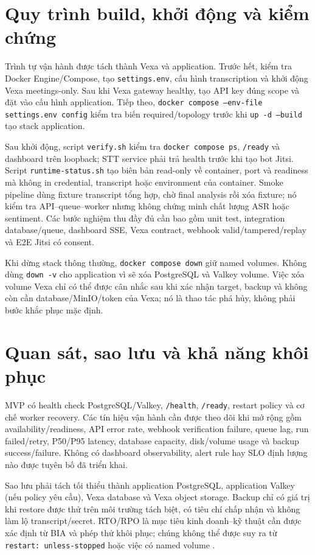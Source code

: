 \section{Quy trình build, khởi động và kiểm chứng}
Trình tự vận hành được tách thành Vexa và application. Trước hết, kiểm tra Docker Engine/Compose, tạo \texttt{settings.env}, cấu hình transcription và khởi động Vexa meetings-only. Sau khi Vexa gateway healthy, tạo API key đúng scope và đặt vào cấu hình application. Tiếp theo, \texttt{docker compose --env-file settings.env config} kiểm tra biến required/topology trước khi \texttt{up -d --build} tạo stack application.

Sau khởi động, script \texttt{verify.sh} kiểm tra \texttt{docker compose ps}, \texttt{/ready} và dashboard trên loopback; STT service phải trả health trước khi tạo bot Jitsi. Script \texttt{runtime-status.sh} tạo biên bản read-only về container, port và readiness mà không in credential, transcript hoặc environment của container. Smoke pipeline dùng fixture transcript tổng hợp, chờ final analysis rồi xóa fixture; nó kiểm tra API--queue--worker nhưng không chứng minh chất lượng ASR hoặc sentiment. Các bước nghiệm thu đầy đủ cần bao gồm unit test, integration database/queue, dashboard SSE, Vexa contract, webhook valid/tampered/replay và E2E Jitsi có consent.

Khi dừng stack thông thường, \texttt{docker compose down} giữ named volumes. Không dùng \texttt{down -v} cho application vì sẽ xóa PostgreSQL và Valkey volume. Việc xóa volume Vexa chỉ có thể được cân nhắc sau khi xác nhận target, backup và không còn cần database/MinIO/token của Vexa; nó là thao tác phá hủy, không phải bước khắc phục mặc định.

\section{Quan sát, sao lưu và khả năng khôi phục}
MVP có health check PostgreSQL/Valkey, \texttt{/health}, \texttt{/ready}, restart policy và cơ chế worker recovery. Các tín hiệu vận hành cần được theo dõi khi mở rộng gồm availability/readiness, API error rate, webhook verification failure, queue lag, run failed/retry, P50/P95 latency, database capacity, disk/volume usage và backup success/failure. Không có dashboard observability, alert rule hay SLO định lượng nào được tuyên bố đã triển khai.

Sao lưu phải tách tối thiểu thành application PostgreSQL, application Valkey (nếu policy yêu cầu), Vexa database và Vexa object storage. Backup chỉ có giá trị khi restore được thử trên môi trường tách biệt, có tiêu chí chấp nhận và không làm lộ transcript/secret. RTO/RPO là mục tiêu kinh doanh--kỹ thuật cần được xác định từ BIA và phép thử khôi phục; chúng không thể được suy ra từ \texttt{restart: unless-stopped} hoặc việc có named volume \cite{nist80034}.

